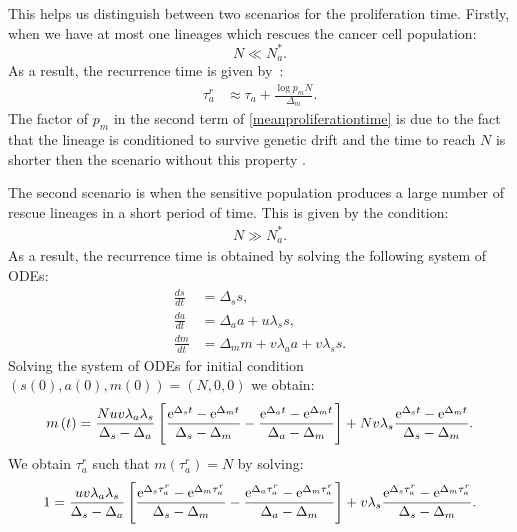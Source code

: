 \documentclass[12pt]{extarticle}
\newcommand{\e}{{\rm e}}
\begin{document}
\begin{appendices}
This helps us distinguish between two scenarios for the proliferation time. Firstly, when we have at most one lineages which rescues the cancer cell population:
\begin{equation*}
N\ll N_a^*.
\end{equation*}
As a result, the recurrence time is given by~\citep{avanzini2019cancer}:
\begin{align}\label{meanproliferationtime}
\tau_a^r&\approx\tau_a+\frac{\log p_mN}{\Delta_m}.
\end{align}
The factor of $p_m$ in the second term of \cref{meanproliferationtime} is due to the fact that the lineage is conditioned to survive genetic drift and the time to reach $N$ is shorter then the scenario without this property \citep{orr2014population,smith1974hitch}. %

The second scenario is when the sensitive population produces a large number of rescue lineages in a short period of time. This is given by the condition:
\begin{align*}
N\gg N_a^*.
\end{align*}
As a result, the recurrence time is obtained by solving the following system of ODEs:
\begin{equation}\label{detODE}
\begin{aligned}
\frac{ds}{dt}&=\Delta_ss,\\
\frac{da}{dt}&=\Delta_aa+u\lambda_ss,\\
\frac{dm}{dt}&=\Delta_mm+v\lambda_aa+v\lambda_ss.
\end{aligned}
\end{equation}
Solving the system of ODEs for initial condition $\left(s(0), a(0), m(0)\right)=\left(N,0,0\right)$ we obtain:
\begin{align*}
m\left(t\right)=\frac{Nuv\lambda_a\lambda_s}{\Delta_s-\Delta_a}\left[\frac{\e^{\Delta_st}-\e^{\Delta_mt}}{\Delta_s-\Delta_m}-\frac{\e^{\Delta_at}-\e^{\Delta_mt}}{\Delta_a-\Delta_m}\right]+Nv\lambda_s\frac{\e^{\Delta_st}-\e^{\Delta_mt}}{\Delta_s-\Delta_m}.
\end{align*}
We obtain $\tau_a^r$ such that $m\left(\tau_a^r\right)=N$ by solving:
\begin{equation}\label{eq:t2det2024}
1=\frac{uv\lambda_a\lambda_s}{\Delta_s-\Delta_a}\left[\frac{\e^{\Delta_s\tau_a^r}-\e^{\Delta_m\tau_a^r}}{\Delta_s-\Delta_m}-\frac{\e^{\Delta_a\tau_a^r}-\e^{\Delta_m\tau_a^r}}{\Delta_a-\Delta_m}\right]+v\lambda_s\frac{\e^{\Delta_s\tau_a^r}-\e^{\Delta_m\tau_a^r}}{\Delta_s-\Delta_m}.
\end{equation}

\end{appendices}
\end{document}

